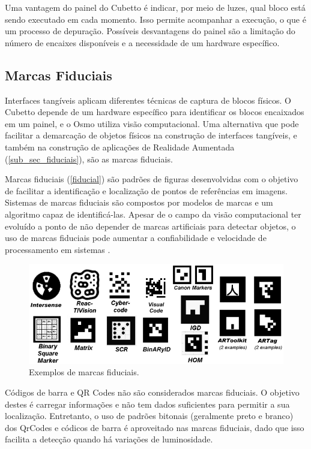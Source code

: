 Uma vantagem do painel do Cubetto é indicar, por meio de luzes, qual bloco está sendo executado em cada momento. Isso permite acompanhar a execução, o que é um processo de depuração. Possíveis desvantagens do painel são a limitação do número de encaixes disponíveis e a necessidade de um hardware específico.

\subsection{Marcas Fiduciais}
\label{sub_sec_fiduciais}
Interfaces tangíveis aplicam diferentes técnicas de captura de blocos físicos. O Cubetto depende de um hardware específico para identificar os blocos encaixados em um painel, e o Osmo utiliza visão computacional. Uma alternativa que pode facilitar a demarcação de objetos físicos na construção de interfaces tangíveis, e também na construção de aplicações de Realidade Aumentada (\autoref{sub_sec_fiduciais}), são as marcas fiduciais.

Marcas fiduciais (\autoref{fiducial}) são padrões de figuras desenvolvidas com o objetivo de facilitar a identificação e localização de pontos de referências em imagens. Sistemas de marcas fiduciais são compostos por modelos de marcas e um algoritmo capaz de identificá-las. Apesar de o campo da visão computacional ter evoluído a ponto de não depender de marcas artificiais para detectar objetos, o uso de marcas fiduciais pode aumentar a confiabilidade e velocidade de processamento em sistemas \cite{fiala_designing_2010}.

\begin{figure}[!htbp]
    \centering
    \includegraphics[width=0.9\linewidth,fbox]{figs/fiducial_marks.png}
    \caption{Exemplos de marcas fiduciais.}
    \label{fiducial}
\end{figure}

Códigos de barra e QR Codes não são considerados marcas fiduciais. O objetivo destes é carregar informações e não tem dados suficientes para permitir a sua localização. Entretanto, o uso de padrões bitonais (geralmente preto e branco) dos QrCodes e códicos de barra é aproveitado nas marcas fiduciais, dado que isso facilita a detecção quando há variações de luminosidade.

